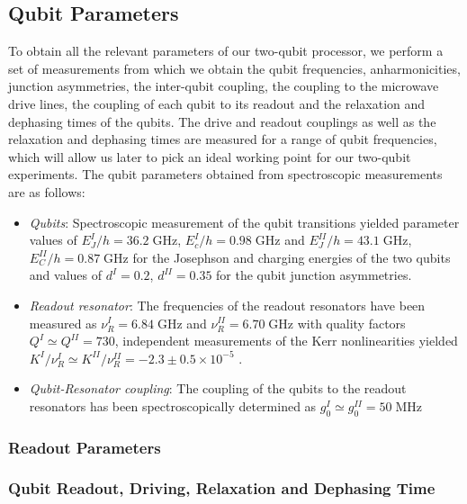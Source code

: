 \subsection{Qubit Parameters}

To obtain all the relevant parameters of our two-qubit processor, we perform a set of measurements from which we obtain the qubit frequencies, anharmonicities, junction asymmetries, the inter-qubit coupling, the coupling to the microwave drive lines, the coupling of each qubit to its readout and the relaxation and dephasing times of the qubits. The drive and readout couplings as well as the relaxation and dephasing times are measured for a range of qubit frequencies, which will allow us later to pick an ideal working point for our two-qubit experiments. The qubit parameters obtained from spectroscopic measurements are as follows:

\begin{itemize}
\item \textit{Qubits}: Spectroscopic measurement of the qubit transitions yielded parameter values of $E_J^I / h = 36.2\; \mathrm{GHz}$, $E_c^I / h = 0.98 \; \mathrm{GHz}$ and $E_J^{II} / h = 43.1\; \mathrm{GHz}$, $E_C^{II} / h = 0.87 \; \mathrm{GHz}$ for the Josephson and charging energies of the two qubits and values of $d^I = 0.2$, $d^{II} =  0.35$ for the qubit junction asymmetries.
\item \textit{Readout resonator}: The frequencies of the readout resonators have been measured as $\nu_R^I = 6.84 \; \mathrm{GHz}$ and $\nu_R^{II} = 6.70 \; \mathrm{GHz}$ with quality factors $Q^I \simeq Q^{II} = 730$, independent measurements of the Kerr nonlinearities yielded $K^I / \nu_R^I \simeq K^{II} / \nu_R^{II} = -2.3\pm 0.5 \times 10^{-5}$ .
\item \textit{Qubit-Resonator coupling}: The coupling of the qubits to the readout resonators has been spectroscopically determined as $g_0^I \simeq g_0^{II} = 50 \; \mathrm{MHz}$
\end{itemize}

\subsubsection{Readout Parameters}

\subsubsection{Qubit Readout, Driving, Relaxation and Dephasing Time}

